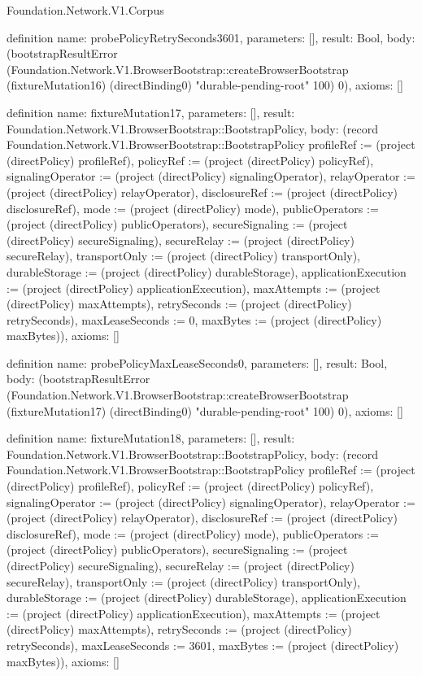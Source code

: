 \begin{lexlean}{Foundation.Network.V1.Corpus}
\begin{semanticmodule}
definition{
  name: probePolicyRetrySeconds3601,
  parameters: [],
  result: Bool,
  body: (bootstrapResultError (Foundation.Network.V1.BrowserBootstrap::createBrowserBootstrap (fixtureMutation16) (directBinding0) "durable-pending-root" 100) 0),
  axioms: []
}

definition{
  name: fixtureMutation17,
  parameters: [],
  result: Foundation.Network.V1.BrowserBootstrap::BootstrapPolicy,
  body: (record Foundation.Network.V1.BrowserBootstrap::BootstrapPolicy {profileRef := (project (directPolicy) profileRef), policyRef := (project (directPolicy) policyRef), signalingOperator := (project (directPolicy) signalingOperator), relayOperator := (project (directPolicy) relayOperator), disclosureRef := (project (directPolicy) disclosureRef), mode := (project (directPolicy) mode), publicOperators := (project (directPolicy) publicOperators), secureSignaling := (project (directPolicy) secureSignaling), secureRelay := (project (directPolicy) secureRelay), transportOnly := (project (directPolicy) transportOnly), durableStorage := (project (directPolicy) durableStorage), applicationExecution := (project (directPolicy) applicationExecution), maxAttempts := (project (directPolicy) maxAttempts), retrySeconds := (project (directPolicy) retrySeconds), maxLeaseSeconds := 0, maxBytes := (project (directPolicy) maxBytes)}),
  axioms: []
}

definition{
  name: probePolicyMaxLeaseSeconds0,
  parameters: [],
  result: Bool,
  body: (bootstrapResultError (Foundation.Network.V1.BrowserBootstrap::createBrowserBootstrap (fixtureMutation17) (directBinding0) "durable-pending-root" 100) 0),
  axioms: []
}

definition{
  name: fixtureMutation18,
  parameters: [],
  result: Foundation.Network.V1.BrowserBootstrap::BootstrapPolicy,
  body: (record Foundation.Network.V1.BrowserBootstrap::BootstrapPolicy {profileRef := (project (directPolicy) profileRef), policyRef := (project (directPolicy) policyRef), signalingOperator := (project (directPolicy) signalingOperator), relayOperator := (project (directPolicy) relayOperator), disclosureRef := (project (directPolicy) disclosureRef), mode := (project (directPolicy) mode), publicOperators := (project (directPolicy) publicOperators), secureSignaling := (project (directPolicy) secureSignaling), secureRelay := (project (directPolicy) secureRelay), transportOnly := (project (directPolicy) transportOnly), durableStorage := (project (directPolicy) durableStorage), applicationExecution := (project (directPolicy) applicationExecution), maxAttempts := (project (directPolicy) maxAttempts), retrySeconds := (project (directPolicy) retrySeconds), maxLeaseSeconds := 3601, maxBytes := (project (directPolicy) maxBytes)}),
  axioms: []
}


\end{semanticmodule}
\end{lexlean}
